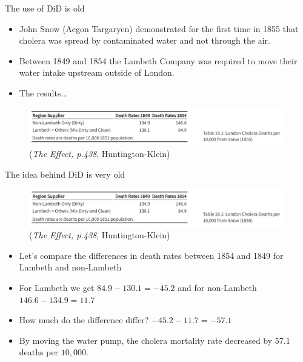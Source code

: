 \documentclass[notes,11pt, aspectratio=169]{beamer}
\begin{document}
\begin{frame}{The use of DiD is old}
    \begin{itemize}
        \item John Snow (Aegon Targaryen) demonstrated for the first time in 1855 that cholera was spread by contaminated water and not through the air. 
        \item Between 1849 and 1854 the Lambeth Company was required to move their water intake upstream outside of London. 
        \item The results...        
    \end{itemize}

\begin{figure}[H]
\centering
        \includegraphics[width=1\linewidth]{24_DiDLecture/24_DiDLecture_John Snow.png}
    \tiny (\emph{The Effect, p.438}, Huntington-Klein)

\end{figure}
\end{frame}

\begin{frame}{The idea behind DiD is very old}
\begin{figure}[H]
\centering
        \includegraphics[width=1\linewidth]{24_DiDLecture/24_DiDLecture_John Snow.png}
    \tiny (\emph{The Effect, p.438}, Huntington-Klein)
\end{figure}

\begin{itemize}
    \item Let's compare the differences in death rates between 1854 and 1849 for Lambeth and non-Lambeth
    \item For Lambeth we get $84.9 - 130.1 = -45.2$ and for non-Lambeth $146.6 - 134.9 = 11.7$ 
    \item How much do the difference differ?  $-45.2-11.7=-57.1$
    \item By moving the water pump, the cholera mortality rate decreased by $57.1$ deaths per $10,000$. 
\end{itemize}
\end{frame}
\end{document}

